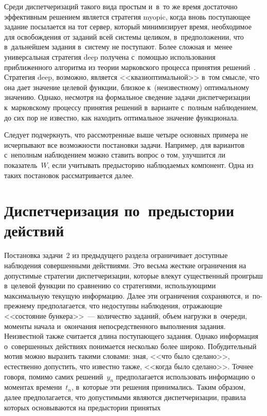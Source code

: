 \begin{multicols}{2}
\begin{enumerate}[1.]
Среди 
диспетчеризаций такого вида простым и~в~то же время достаточно эффективным 
решением является стратегия myopic, когда вновь поступающее задание посылается на тот 
сервер, который минимизирует время, необходимое для освобождения от заданий всей 
системы целиком, в~предположении, что в~дальнейшем задания в~систему не поступают. 
Более сложная и~менее универсальная стратегия deep получена с~помощью использования 
приближенного алгоритма из теории марковского процесса принятия  
решений~\cite{21-kon}. Стратегия deep, возможно, является <<квазиоптимальной>> в~том 
смысле, что она дает значение целевой функции, близкое к~(неизвестному) оптимальному 
значению. Однако, несмотря на формальное сведение задачи диспетчеризации 
к~марковскому процессу принятия решений в~варианте с~полным наблюдением, до сих 
пор не известно, как находить оптимальное значение функционала.
    \end{enumerate}
    
    Следует подчеркнуть, что рассмотренные выше четыре основных примера не 
исчерпывают все возможности постановки задачи. Например, для вариантов с~неполным 
наблюдением можно ставить вопрос о том, улучшится ли показатель~$W$, если 
учитывать предысторию наблюдаемых компонент. Одна из таких постановок 
рассматривается далее.

\vspace*{-9pt}

\section{Диспетчеризация по~предыстории действий}

    Постановка задачи~2 из предыдущего раздела ограничивает доступные наблюдения 
совершенными действиями. Это весьма жесткие ограничения на допустимые стратегии 
диспетчеризации, которые влекут существенный проигрыш в~целевой функции по 
сравнению со стратегиями, использу\-ющи\-ми максимальную текущую информацию. Далее 
эти ограничения сохраняются, и~по-преж\-не\-му предполагается, что недоступны 
наблюдения, отражающие <<состояние бункера>>~--- количество заданий, объем 
нагрузки в~очереди, моменты начала и~окончания непосредственного выполнения за\-дания. 
Неизвестной также считается длина поступающего задания. Однако информация 
о~совершенных действиях понимается несколько более широко. Побудительный мотив 
можно выразить такими словами: зная, <<что было сделано>>, естественно допустить, что 
известно также, <<когда было сделано>>. Точнее говоря, помимо самих решений~$y_n$ 
предполагается использовать информацию о моментах времени~$t_n$, в~которые эти 
решения принимались. Таким образом, далее предполагается, что допустимыми являются 
диспетчеризации, правила которых основываются на предыстории принятых\linebreak\vspace*{-12pt}


\end{multicols}
